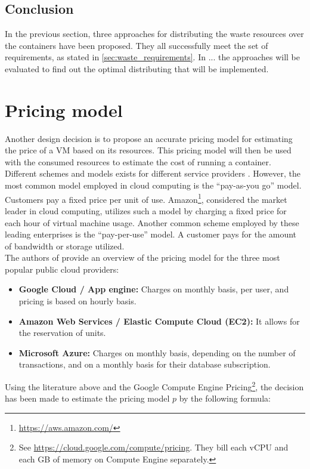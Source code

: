 \subsection{Conclusion}
In the previous section, three approaches for distributing the waste resources over the containers have been proposed. They all successfully meet the set of requirements, as stated in \autoref{sec:waste_requirements}. In ... the approaches will be evaluated to find out the optimal distributing that will be implemented.


\section{Pricing model} \label{sec:pricing}
Another design decision is to propose an accurate pricing model for estimating the price of a VM based on its resources.
This pricing model will then be used with the consumed resources to estimate the cost of running a container.
Different schemes and models exists for different service providers \cite{bulla2014cloud}. However, the most common model employed in cloud computing is the ``pay-as-you go'' model. Customers pay a fixed price per unit of use. Amazon\footnote{\url{https://aws.amazon.com/}}, considered the market leader in cloud computing, utilizes such a model by charging a fixed price for each hour of virtual machine usage. 
Another common scheme employed by these leading enterprises is the ``pay-per-use'' model. A customer pays for the amount of bandwidth or storage utilized.\\

\noindent
The authors of \cite{mazrekaj2016pricing} provide an overview of the pricing model for the three most popular public cloud providers:
\begin{itemize}
    \item \textbf{Google Cloud / App engine: }Charges on monthly basis, per user, and pricing is based on hourly basis.
    \item \textbf{Amazon Web Services / Elastic Compute Cloud (EC2): }It allows for the reservation of units.
    \item \textbf{Microsoft Azure: }Charges on monthly basis, depending on the number of transactions, and on a monthly basis for their database subscription.
\end{itemize}

Using the literature above and the Google Compute Engine Pricing\footnote{See \url{https://cloud.google.com/compute/pricing}. They bill each vCPU and each GB of memory on Compute Engine separately.}, the decision has been made to estimate the pricing model $p$ by the following formula:

